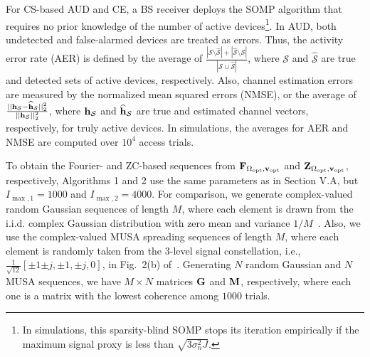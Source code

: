 \documentclass[journal]{IEEEtran}
\newcommand{\mS}{\mathcal{S}}
\newcommand{\hbu}{{\bf h}}
\newcommand{\vbu}{{\bf v}}
\newcommand{\Fbu}{{\bf F}}
\newcommand{\Mbu}{{\bf M}}
\newcommand{\Gbu}{{\bf G}}
\newcommand{\Zbu}{{\bf Z}}
\numberwithin{const2}{const}
\begin{document}
For CS-based AUD and CE, %
a BS receiver deploys the SOMP algorithm that requires
no prior knowledge of the number of active devices\footnote{
In simulations, this sparsity-blind SOMP stops its iteration empirically %
if the maximum signal proxy is less than $\sqrt{3\sigma_n ^2 J}$.}.
In AUD, both undetected and false-alarmed devices
are treated as errors.
Thus, the activity error rate (AER) is defined by the average of 
$\frac{|\mS \setminus \widehat{\mS} | + |\widehat{\mS} \setminus \mS  |}{|\mS \cup \widehat{\mS}|}$,
where $\mS$ and $\widehat{\mS}$ are true and detected sets of active devices, respectively.
Also, channel estimation errors are measured by the normalized 
mean squared errors (NMSE), or the average of
$\frac{|| \hbu_\mS - \widehat{\hbu}_{\mS} ||_2 ^2}{|| \hbu_\mS ||_2 ^2}$,
where $\hbu_\mS$ and $ \widehat{\hbu}_{\mS}$ are true and estimated channel vectors,
respectively, for truly active devices.
In simulations, the averages for AER and NMSE are computed over $10^4$ access trials.




To obtain the Fourier- and ZC-based sequences %
from 
$\Fbu_{\Omega_{\rm opt}, \vbu_{\rm opt}}$ and 
$\Zbu_{\Omega_{\rm opt}, \vbu_{\rm opt}}$, 
respectively,
Algorithms 1 and 2 use the same parameters as in Section V.A, but $I_{\max, 1} = 1000$ and $I_{\max, 2} = 4000$.
For comparison, 
we generate complex-valued random Gaussian sequences of length $M$, 
where each element is drawn from the i.i.d. complex Gaussian distribution 
with zero mean and variance $1/M$~\cite{Liu:mimo}.
Also, we use the complex-valued MUSA spreading sequences of length $M$,
where each element is randomly taken from the 3-level signal constellation, i.e.,
$\frac{1}{\sqrt{12}} [{\pm 1} {\pm j} , \pm 1, \pm j, 0]$, in Fig.~2(b) of~\cite{Yuan:MUSA}.
Generating $N$ random Gaussian and $N$ %
MUSA sequences, we have
$M \times N$ matrices $\Gbu$ and $\Mbu$, respectively, 
where each one is a matrix with the lowest coherence 
among $1000$ trials.
\end{document}
